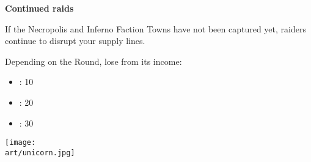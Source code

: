 \begin{multicols*}{2}
\textbf{Continued raids}

If the Necropolis and Inferno Faction Towns have not been captured yet, raiders continue to disrupt your supply lines.

\textcolor{darkcandyapplered}{
Depending on the Round, lose from its income:
\begin{itemize}
  \item \textbf{}: 10 
  \item \textbf{}: 20 
  \item \textbf{}: 30 
\end{itemize}
}

\vspace*{\fill}
\texttt{[image: \\art/unicorn.jpg]}

\end{multicols*}
